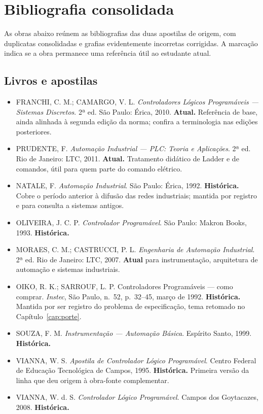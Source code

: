 \section{Bibliografia consolidada}

As obras abaixo reúnem as bibliografias das duas apostilas de origem, com duplicatas consolidadas e
grafias evidentemente incorretas corrigidas. A marcação indica se a obra permanece uma referência
útil ao estudante atual.

\subsection{Livros e apostilas}

\begin{itemize}[leftmargin=1.2cm, label={}]
  \item FRANCHI, C. M.; CAMARGO, V. L. \emph{Controladores Lógicos Programáveis --- Sistemas
        Discretos}. 2ª ed. São Paulo: Érica, 2010. \textbf{Atual.} Referência de base, ainda alinhada
        à segunda edição da norma; confira a terminologia nas edições posteriores.
  \item PRUDENTE, F. \emph{Automação Industrial --- PLC: Teoria e Aplicações}. 2ª ed. Rio de Janeiro:
        LTC, 2011. \textbf{Atual.} Tratamento didático de Ladder e de comandos, útil para quem parte
        do comando elétrico.
  \item NATALE, F. \emph{Automação Industrial}. São Paulo: Érica, 1992. \textbf{Histórica.} Cobre o
        período anterior à difusão das redes industriais; mantida por registro e para consulta a
        sistemas antigos.
  \item OLIVEIRA, J. C. P. \emph{Controlador Programável}. São Paulo: Makron Books, 1993.
        \textbf{Histórica.}
  \item MORAES, C. M.; CASTRUCCI, P. L. \emph{Engenharia de Automação Industrial}. 2ª ed. Rio de
        Janeiro: LTC, 2007. \textbf{Atual} para instrumentação, arquitetura de automação e sistemas
        industriais.
  \item OIKO, R. K.; SARROUF, L. P. Controladores Programáveis --- como comprar. \emph{Instec}, São
        Paulo, n.~52, p.~32--45, março de 1992. \textbf{Histórica.} Mantida por ser registro do
        problema de especificação, tema retomado no Capítulo~\ref{cap:porte}.
  \item SOUZA, F. M. \emph{Instrumentação --- Automação Básica}. Espírito Santo, 1999.
        \textbf{Histórica.}
  \item VIANNA, W. S. \emph{Apostila de Controlador Lógico Programável}. Centro Federal de Educação
        Tecnológica de Campos, 1995. \textbf{Histórica.} Primeira versão da linha que deu origem à
        obra-fonte complementar.
  \item VIANNA, W. d. S. \emph{Controlador Lógico Programável}. Campos dos Goytacazes, 2008.
        \textbf{Histórica.}
\end{itemize}

